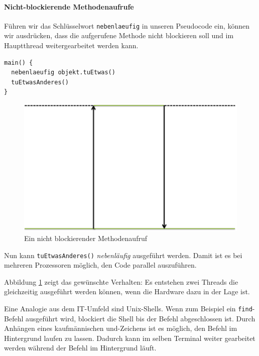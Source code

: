 \paragraph{Nicht-blockierende Methodenaufrufe} Führen wir das Schlüsselwort
\texttt{nebenlaeufig} in unseren Pseudocode ein,
können wir ausdrücken, dass die aufgerufene Methode nicht blockieren soll
und im Hauptthread weitergearbeitet werden kann.

\begin{lstlisting}[caption={Nebenläufiger Methodenaufruf},label={lst:codeConcurrent},captionpos=b]
main() {
  nebenlaeufig objekt.tuEtwas()
  tuEtwasAnderes()
}
\end{lstlisting}

\begin{figure}[htbp]
  \centering
	\includegraphics[scale=0.6]{pic/NonBlockingCall.png}
  \caption{Ein nicht blockierender Methodenaufruf }
  \label{nonBlockingCall}
\end{figure}

Nun kann \texttt{tuEtwasAnderes()} \emph{nebenläufig} ausgeführt werden. Damit
ist es bei mehreren Prozessoren möglich, den Code parallel auszuführen.

Abbildung \ref{nonBlockingCall} zeigt das gewünschte Verhalten:
Es entstehen zwei Threads die gleichzeitig ausgeführt werden können,
wenn die Hardware dazu in der Lage ist.

Eine Analogie aus dem IT-Umfeld sind Unix-Shells. Wenn zum Beispiel ein
\texttt{find}-Befehl ausgeführt wird, blockiert die Shell bis der Befehl
abgeschlossen ist. Durch Anhängen eines kaufmännischen \glqq und\grqq{}-Zeichens 
ist es möglich,
den Befehl im Hintergrund laufen zu lassen. Dadurch kann im selben
Terminal weiter gearbeitet werden während der Befehl im Hintergrund
läuft.

